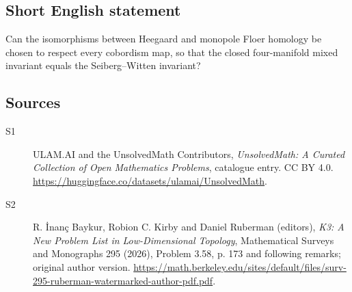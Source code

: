 \documentclass[11pt]{article}
\begin{document}
\subsection{Short English statement}
Can the isomorphisms between Heegaard and monopole Floer homology be chosen to respect every cobordism map, so that the closed four-manifold mixed invariant equals the Seiberg--Witten invariant?
\subsection{Sources}
\begin{description}
\item[\hypertarget{source:statement:1}{S1}] ULAM.AI and the UnsolvedMath Contributors, \emph{UnsolvedMath: A Curated Collection of Open Mathematics Problems}, catalogue entry. CC BY 4.0. \url{https://huggingface.co/datasets/ulamai/UnsolvedMath}.
\item[\hypertarget{source:statement:2}{S2}] R. İnanç Baykur, Robion C. Kirby and Daniel Ruberman (editors), \emph{K3: A New Problem List in Low-Dimensional Topology}, Mathematical Surveys and Monographs 295 (2026), Problem 3.58, p. 173 and following remarks; original author version. \url{https://math.berkeley.edu/sites/default/files/surv-295-ruberman-watermarked-author-pdf.pdf}.
\end{description}
\label{end:statement}
\end{document}

